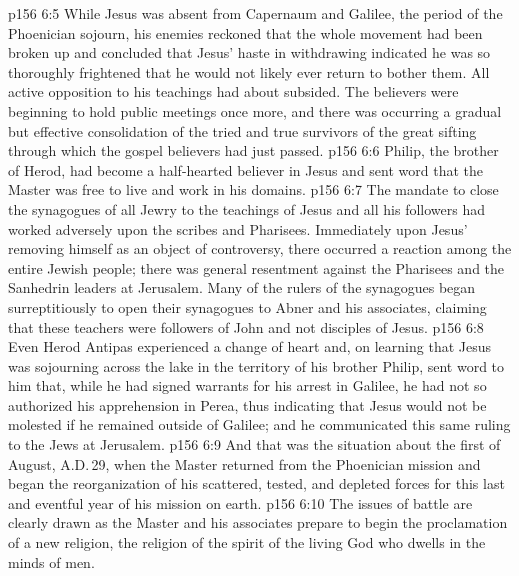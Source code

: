 \vs p156 6:5 \pc While Jesus was absent from Capernaum and Galilee, the period of the Phoenician sojourn, his enemies reckoned that the whole movement had been broken up and concluded that Jesus’ haste in withdrawing indicated he was so thoroughly frightened that he would not likely ever return to bother them. All active opposition to his teachings had about subsided. The believers were beginning to hold public meetings once more, and there was occurring a gradual but effective consolidation of the tried and true survivors of the great sifting through which the gospel believers had just passed.
\vs p156 6:6 Philip, the brother of Herod, had become a half\hyp{}hearted believer in Jesus and sent word that the Master was free to live and work in his domains.
\vs p156 6:7 The mandate to close the synagogues of all Jewry to the teachings of Jesus and all his followers had worked adversely upon the scribes and Pharisees. Immediately upon Jesus’ removing himself as an object of controversy, there occurred a reaction among the entire Jewish people; there was general resentment against the Pharisees and the Sanhedrin leaders at Jerusalem. Many of the rulers of the synagogues began surreptitiously to open their synagogues to Abner and his associates, claiming that these teachers were followers of John and not disciples of Jesus.
\vs p156 6:8 Even Herod Antipas experienced a change of heart and, on learning that Jesus was sojourning across the lake in the territory of his brother Philip, sent word to him that, while he had signed warrants for his arrest in Galilee, he had not so authorized his apprehension in Perea, thus indicating that Jesus would not be molested if he remained outside of Galilee; and he communicated this same ruling to the Jews at Jerusalem.
\vs p156 6:9 And that was the situation about the first of August, A.D.\,29, when the Master returned from the Phoenician mission and began the reorganization of his scattered, tested, and depleted forces for this last and eventful year of his mission on earth.
\vs p156 6:10 The issues of battle are clearly drawn as the Master and his associates prepare to begin the proclamation of a new religion, the religion of the spirit of the living God who dwells in the minds of men.
\quizlink
